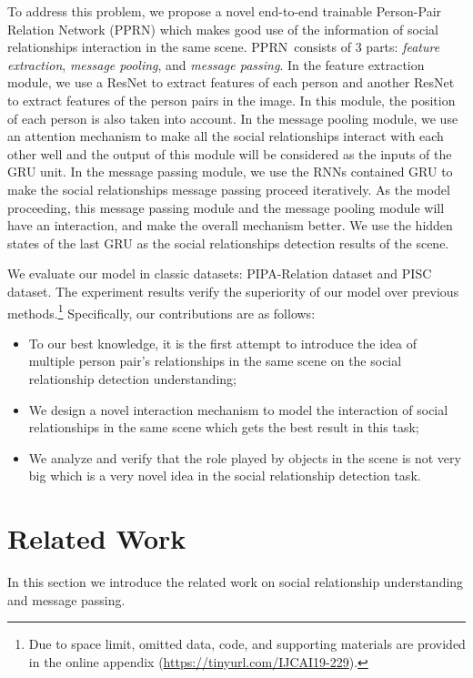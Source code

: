 \documentclass{article}
\newcommand{\PPRN}{{\sf PPRN}}
\begin{document}
To address this problem, we propose a novel end-to-end trainable Person-Pair Relation Network (\PPRN) which makes good use of the information of social relationships interaction in the same scene. \PPRN \ consists of 3 parts:  \emph{feature extraction}, \emph{message pooling}, and \emph{message passing}. In the feature extraction module, we use a ResNet \cite{DBLP:conf/cvpr/HeZRS16} to extract features of each person and another ResNet to extract features of the person pairs in the image. In this module, the position of each person is also taken into account. In the message pooling module, we use an attention mechanism to make all the social relationships interact with each other well and the output of this module will be considered as the inputs of the GRU unit. In the message passing module,  we use the RNNs contained GRU to make the social relationships message passing proceed iteratively. As the model proceeding, this message passing module and the message pooling module will have an interaction, and make the overall mechanism better. We use the hidden states of the last GRU as the social relationships detection results of the scene.

We evaluate our model in classic datasets: PIPA-Relation dataset and PISC dataset. The experiment results verify the superiority of our model over previous methods.\footnote{Due to space limit, omitted data, code, and supporting materials are provided in the online appendix ({\scriptsize\url{https://tinyurl.com/IJCAI19-229}}).} Specifically, our contributions are as follows:
\begin{itemize}
	\item To our best knowledge, it is the first attempt to introduce the idea of multiple person pair's relationships in the same scene on the social relationship detection understanding;
	\item We design a novel interaction mechanism to model the interaction of social relationships in the same scene which gets the best result in this task;
	\item We analyze and verify that the role played by objects in the scene is not very big which is a very novel idea in the social relationship detection task.
\end{itemize}


\section{Related Work}
In this section we introduce the related work on social relationship understanding and message passing.
\end{document}
